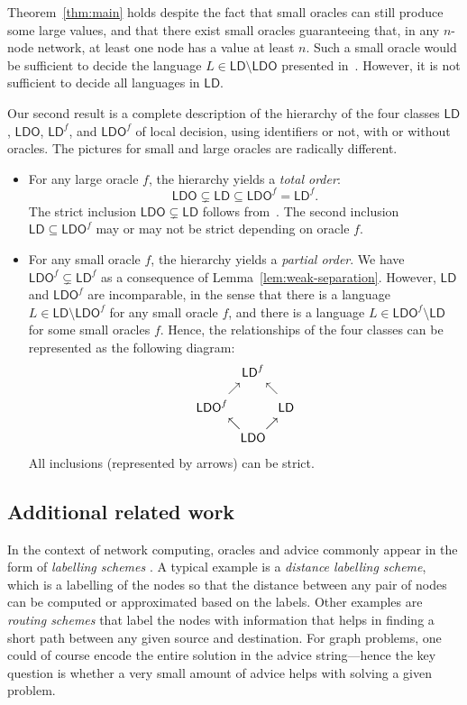 \documentclass[11pt,a4paper]{article}
\theoremstyle{definition}
\theoremstyle{remark}
\newcommand{\ldo}{\mathsf{LDO}}
\newcommand{\ld}{\mathsf{LD}}
\begin{document}
Theorem~\ref{thm:main} holds despite the fact that small oracles can still produce some large values, and that there exist small oracles guaranteeing that, in any $n$-node network, at least one node has a value at least $n$. Such a small oracle would be sufficient to decide the language $L \in \ld \setminus \ldo$ presented in~\cite{fraigniaud13ld-id}. However, it is not sufficient to decide all languages in $\ld$.

Our second result is a complete description of the hierarchy of the four classes $\ld$, $\ldo$, $\ld^f$, and $\ldo^f$ of local decision, using identifiers or not,  with or without oracles. The pictures for small and large oracles are radically different. 
\begin{itemize}
\item  For any large oracle $f$, the hierarchy yields a \emph{total order}:
\[
\ldo \subsetneq \ld \subseteq \ldo^f=\ld^f.
\]
The strict inclusion $\ldo \subsetneq \ld$ follows from~\cite{fraigniaud13ld-id}. The second inclusion $\ld \subseteq \ldo^f$ may or may not be strict depending on oracle $f$. 

\item For any small oracle $f$, the hierarchy yields a \emph{partial order}. We have $\ldo^f\subsetneq \ld^f$ as a consequence of Lemma~\ref{lem:weak-separation}. However, $\ld$ and $\ldo^f$ are incomparable, in the sense that there is a language $L \in \ld \setminus \ldo^f$ for any small oracle $f$, and there is a language $L \in \ldo^f \setminus \ld$ for some small oracles $f$. Hence, the relationships of the four classes can be represented as the following diagram: 
\[
\begin{array}{c@{}c@{}c@{}c@{}c}
  && \ld^f && \\
  & \nearrow &&  \nwarrow & \\[3pt]
 \ldo^f  &&&& \ld \\
  & \nwarrow && \nearrow & \\
  && \ldo &&
\end{array}
\]
All inclusions (represented by arrows) can be strict. 
\end{itemize}


\subsection{Additional related work}

In the context of network computing, oracles and advice commonly appear in the form of \emph{labelling schemes} \cite{gavoille03compact,fraigniaud07distributed}. A typical example is a \emph{distance labelling scheme}, which is a labelling of the nodes so that the distance between any pair of nodes can be computed or approximated based on the labels. Other examples are \emph{routing schemes} that label the nodes with information that helps in finding a short path between any given source and destination. For graph problems, one could of course encode the entire solution in the advice string---hence the key question is whether a very small amount of advice helps with solving a given problem.
\end{document}
